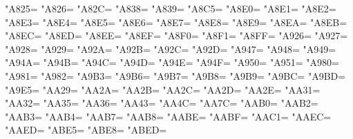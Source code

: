 \XeTeXcharclass"A825=\KclassNum
\XeTeXcharclass"A826=\KclassNum
\XeTeXcharclass"A82C=\KclassNum
\XeTeXcharclass"A838=\KclassNum
\XeTeXcharclass"A839=\KclassNum
\XeTeXcharclass"A8C5=\KclassNum
\XeTeXcharclass"A8E0=\KclassNum
\XeTeXcharclass"A8E1=\KclassNum
\XeTeXcharclass"A8E2=\KclassNum
\XeTeXcharclass"A8E3=\KclassNum
\XeTeXcharclass"A8E4=\KclassNum
\XeTeXcharclass"A8E5=\KclassNum
\XeTeXcharclass"A8E6=\KclassNum
\XeTeXcharclass"A8E7=\KclassNum
\XeTeXcharclass"A8E8=\KclassNum
\XeTeXcharclass"A8E9=\KclassNum
\XeTeXcharclass"A8EA=\KclassNum
\XeTeXcharclass"A8EB=\KclassNum
\XeTeXcharclass"A8EC=\KclassNum
\XeTeXcharclass"A8ED=\KclassNum
\XeTeXcharclass"A8EE=\KclassNum
\XeTeXcharclass"A8EF=\KclassNum
\XeTeXcharclass"A8F0=\KclassNum
\XeTeXcharclass"A8F1=\KclassNum
\XeTeXcharclass"A8FF=\KclassNum
\XeTeXcharclass"A926=\KclassNum
\XeTeXcharclass"A927=\KclassNum
\XeTeXcharclass"A928=\KclassNum
\XeTeXcharclass"A929=\KclassNum
\XeTeXcharclass"A92A=\KclassNum
\XeTeXcharclass"A92B=\KclassNum
\XeTeXcharclass"A92C=\KclassNum
\XeTeXcharclass"A92D=\KclassNum
\XeTeXcharclass"A947=\KclassNum
\XeTeXcharclass"A948=\KclassNum
\XeTeXcharclass"A949=\KclassNum
\XeTeXcharclass"A94A=\KclassNum
\XeTeXcharclass"A94B=\KclassNum
\XeTeXcharclass"A94C=\KclassNum
\XeTeXcharclass"A94D=\KclassNum
\XeTeXcharclass"A94E=\KclassNum
\XeTeXcharclass"A94F=\KclassNum
\XeTeXcharclass"A950=\KclassNum
\XeTeXcharclass"A951=\KclassNum
\XeTeXcharclass"A980=\KclassNum
\XeTeXcharclass"A981=\KclassNum
\XeTeXcharclass"A982=\KclassNum
\XeTeXcharclass"A9B3=\KclassNum
\XeTeXcharclass"A9B6=\KclassNum
\XeTeXcharclass"A9B7=\KclassNum
\XeTeXcharclass"A9B8=\KclassNum
\XeTeXcharclass"A9B9=\KclassNum
\XeTeXcharclass"A9BC=\KclassNum
\XeTeXcharclass"A9BD=\KclassNum
\XeTeXcharclass"A9E5=\KclassNum
\XeTeXcharclass"AA29=\KclassNum
\XeTeXcharclass"AA2A=\KclassNum
\XeTeXcharclass"AA2B=\KclassNum
\XeTeXcharclass"AA2C=\KclassNum
\XeTeXcharclass"AA2D=\KclassNum
\XeTeXcharclass"AA2E=\KclassNum
\XeTeXcharclass"AA31=\KclassNum
\XeTeXcharclass"AA32=\KclassNum
\XeTeXcharclass"AA35=\KclassNum
\XeTeXcharclass"AA36=\KclassNum
\XeTeXcharclass"AA43=\KclassNum
\XeTeXcharclass"AA4C=\KclassNum
\XeTeXcharclass"AA7C=\KclassNum
\XeTeXcharclass"AAB0=\KclassNum
\XeTeXcharclass"AAB2=\KclassNum
\XeTeXcharclass"AAB3=\KclassNum
\XeTeXcharclass"AAB4=\KclassNum
\XeTeXcharclass"AAB7=\KclassNum
\XeTeXcharclass"AAB8=\KclassNum
\XeTeXcharclass"AABE=\KclassNum
\XeTeXcharclass"AABF=\KclassNum
\XeTeXcharclass"AAC1=\KclassNum
\XeTeXcharclass"AAEC=\KclassNum
\XeTeXcharclass"AAED=\KclassNum
\XeTeXcharclass"ABE5=\KclassNum
\XeTeXcharclass"ABE8=\KclassNum
\XeTeXcharclass"ABED=\KclassNum
